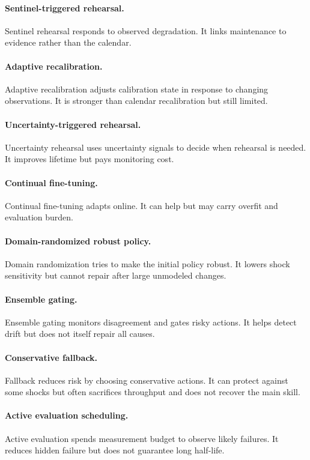 \documentclass{article}
\begin{document}
\paragraph{Sentinel-triggered rehearsal.}
Sentinel rehearsal responds to observed degradation. It links maintenance to
evidence rather than the calendar.

\paragraph{Adaptive recalibration.}
Adaptive recalibration adjusts calibration state in response to changing
observations. It is stronger than calendar recalibration but still limited.

\paragraph{Uncertainty-triggered rehearsal.}
Uncertainty rehearsal uses uncertainty signals to decide when rehearsal is
needed. It improves lifetime but pays monitoring cost.

\paragraph{Continual fine-tuning.}
Continual fine-tuning adapts online. It can help but may carry overfit and
evaluation burden.

\paragraph{Domain-randomized robust policy.}
Domain randomization tries to make the initial policy robust. It lowers shock
sensitivity but cannot repair after large unmodeled changes.

\paragraph{Ensemble gating.}
Ensemble gating monitors disagreement and gates risky actions. It helps detect
drift but does not itself repair all causes.

\paragraph{Conservative fallback.}
Fallback reduces risk by choosing conservative actions. It can protect against
some shocks but often sacrifices throughput and does not recover the main skill.

\paragraph{Active evaluation scheduling.}
Active evaluation spends measurement budget to observe likely failures. It
reduces hidden failure but does not guarantee long half-life.
\end{document}
